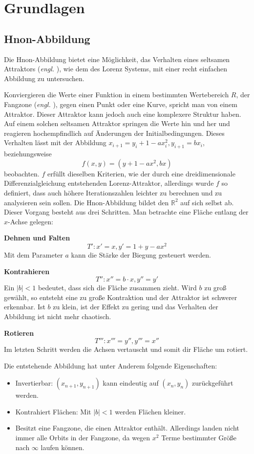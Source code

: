 
\chapter{Grundlagen}
\label{ch:Grundlagen}
\section{H\e non-Abbildung}
Die H\e non-Abbildung bietet eine Möglichkeit, das Verhalten eines seltsamen Attraktors (\textit{engl. }), wie dem des Lorenz Systems, mit einer recht einfachen Abbildung zu untersuchen.

Konviergieren die Werte einer Funktion in einem bestimmten Wertebereich $R$, der Fangzone (\textit{engl. }), gegen einen Punkt oder eine Kurve, spricht man von einem Attraktor. Dieser Attraktor kann jedoch auch eine komplexere Struktur haben. Auf einem solchen seltsamen Attraktor springen die Werte hin und her und reagieren hochempfindlich auf Änderungen der Initialbedingungen. Dieses Verhalten lässt mit der Abbildung $x_{i+1}=y_i + 1- a x_i^2, y_{i+1} = bx_i$, beziehungsweise 
$$f(x,y) = (y + 1- a x^2,bx)$$
beobachten. $f$ erfüllt dieselben Kriterien, wie der durch eine dreidimensionale Differenzialgleichung entstehenden Lorenz-Attraktor, allerdings wurde $f$ so definiert, dass auch höhere Iterationszahlen leichter zu berechnen und zu analysieren sein sollen. Die H\e non-Abbildung bildet den $\mathbb{R}^2$ auf sich selbst ab. Dieser Vorgang besteht aus drei Schritten. Man betrachte eine Fläche entlang der $x$-Achse gelegen:

\textbf{Dehnen und Falten}
$$T': x'=x, y'= 1+ y - ax^2$$
Mit dem Parameter $a$ kann die Stärke der Biegung gesteuert werden.


\textbf{Kontrahieren}
$$T'': x''= b\cdot x, y''= y'$$
Ein $|b|<1$ bedeutet, dass sich die Fläche zusammen zieht. Wird $b$ zu groß gewählt, so entsteht eine zu große Kontraktion und der Attraktor ist schwerer erkennbar. Ist $b$ zu klein, ist der Effekt zu gering und das Verhalten der Abbildung ist nicht mehr chaotisch.


\textbf{Rotieren}
$$T''': x'''= y'', y'''= x''$$
Im letzten Schritt werden die Achsen vertauscht und somit dir Fläche um rotiert.


Die entstehende Abbildung hat unter Anderem folgende Eigenschaften:
\begin{itemize}
 \item Invertierbar: $(x_{n+1}, y_{n+1})$ kann eindeutig auf $(x_n, y_n)$ zurückgeführt werden.
 \item Kontrahiert Flächen: Mit $|b|<1$ werden Flächen kleiner.
 \item Besitzt eine Fangzone, die einen Attraktor enthält. Allerdings landen nicht immer alle Orbits in der Fangzone, da wegen $x^2$ Terme bestimmter Größe nach $\infty$ laufen können.
\end{itemize}


